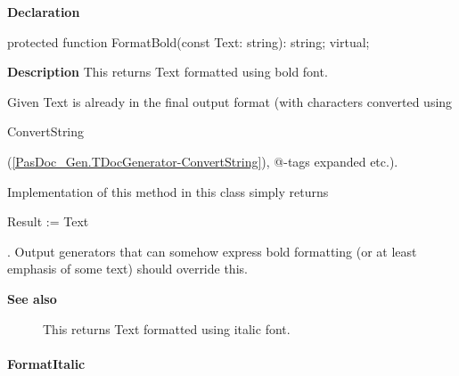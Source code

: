 \documentclass{report}
\newif\ifpdf
\begin{document}
\label{PasDoc_Gen.TDocGenerator-FormatBold}
\begin{list}{}{
\setlength{\itemindent}{0cm}
\setlength{\listparindent}{0cm}
\setlength{\leftmargin}{\evensidemargin}
\addtolength{\leftmargin}{\tmplength}
\settowidth{\labelsep}{X}
\addtolength{\leftmargin}{\labelsep}
\setlength{\labelwidth}{\tmplength}
}
\item[\textbf{Declaration}\hfill]
\ifpdf
\begin{flushleft}
\fi
\begin{ttfamily}
protected function FormatBold(const Text: string): string; virtual;\end{ttfamily}

\ifpdf
\end{flushleft}
\fi

\par
\item[\textbf{Description}]
This returns Text formatted using bold font.

Given Text is already in the final output format (with characters converted using \begin{ttfamily}ConvertString\end{ttfamily}(\ref{PasDoc_Gen.TDocGenerator-ConvertString}), @{-}tags expanded etc.).

Implementation of this method in this class simply returns \begin{ttfamily}Result := Text\end{ttfamily}. Output generators that can somehow express bold formatting (or at least emphasis of some text) should override this.

\item[\textbf{See also}]
\begin{description}
\item[\begin{ttfamily}FormatItalic\end{ttfamily}(\ref{PasDoc_Gen.TDocGenerator-FormatItalic})] 
This returns Text formatted using italic font.
\end{description}


\end{list}
\paragraph*{FormatItalic}\hspace*{\fill}
\end{document}
